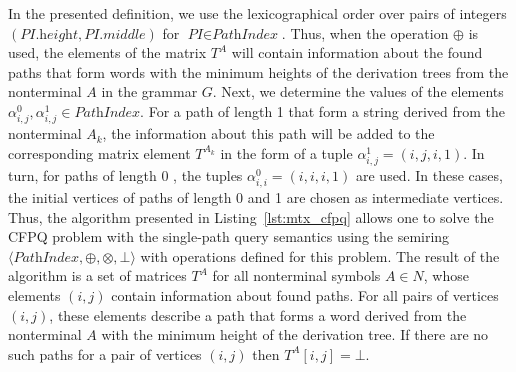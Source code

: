 In the presented definition, we use the lexicographical order over pairs of integers $(\textit{PI}.\textit{height}, \textit{PI}.\textit{middle})$ for $\textit{PI} \in \textit{PathIndex}$. Thus, when the operation $\oplus$ is used, the elements of the matrix $T^A$ will contain information about the found paths that form words with the minimum heights of the derivation trees from the nonterminal $A$ in the grammar $G$. Next, we determine the values of the elements $\alpha^0_{i, j}, \alpha^1_{i, j} \in \textit{PathIndex}$. For a path of length 1 that form a string derived from the nonterminal $A_k$, the information about this path will be added to the corresponding matrix element $T^{A_k}$ in the form of a tuple $\alpha^1_{i, j} = (i, j, i, 1)$. In turn, for paths of length 0 , the tuples $\alpha^0_{i, i} = (i, i, i, 1)$ are used. In these cases, the initial vertices of paths of length 0 and 1 are chosen as intermediate vertices. Thus, the algorithm presented in Listing~\ref{lst:mtx_cfpq} allows one to solve the CFPQ problem with the single-path query semantics using the semiring $\langle \textit{PathIndex}, \oplus, \otimes, \bot \rangle$ with operations defined for this problem. The result of the algorithm is a set of matrices $T^A$ for all nonterminal symbols $A \in N$, whose elements $(i, j)$ contain information about found paths. For all pairs of vertices $(i, j)$, these elements describe a path that forms a word derived from the nonterminal $A$ with the minimum height of the derivation tree. If there are no such paths for a pair of vertices $(i, j)$ then $T^A[i, j] = \bot$.

